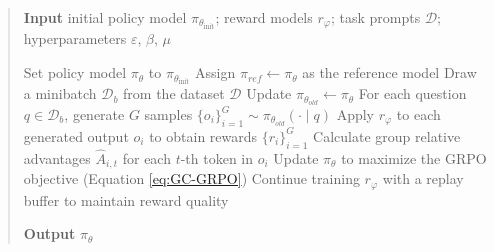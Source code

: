 \begin{abstract}
\begin{itemize}[topsep=0pt]
\begin{itemize}[topsep=0pt]
\begin{itemize}[topsep=0pt]
\begin{algorithm}[t]
  \small
  \caption{Iterative Group Relative Policy Optimization}
  \textbf{Input} initial policy model $\pi_{\theta_{\text{init}}}$; reward models $r_\varphi$; task prompts $\mathcal{D}$; 
  hyperparameters $\varepsilon$, $\beta$, $\mu$
  \begin{algorithmic}[1]
    \State Set policy model $\pi_\theta$ to $\pi_{\theta_{\text{init}}}$
       \State Assign $\pi_{ref} \gets \pi_{\theta}$ as the reference model
      \State Draw a minibatch $\mathcal{D}_b$ from the dataset $\mathcal{D}$
      \State Update $\pi_{\theta_{old}} \gets \pi_{\theta}$
      \State For each question $q \in \mathcal{D}_b$, generate $G$ samples $\{o_i\}_{i=1}^G \sim \pi_{\theta_{old}}(\cdot \mid q)$
      \State Apply $r_\varphi$ to each generated output $o_i$ to obtain rewards $\{r_i\}_{i=1}^{G}$
      \State Calculate group relative advantages $\hat{A}_{i,t}$ for each $t$-th token in $o_i$
        \State Update $\pi_\theta$ to maximize the GRPO objective (Equation \ref{eq:GC-GRPO})
      \EndFor
    \EndFor
    \State Continue training $r_\varphi$ with a replay buffer to maintain reward quality
    \EndFor
  \end{algorithmic}
  \textbf{Output} $\pi_\theta$
  \label{alg:iter-grpo}
\end{algorithm}


\end{itemize}
\end{itemize}
\end{itemize}
\end{abstract}
